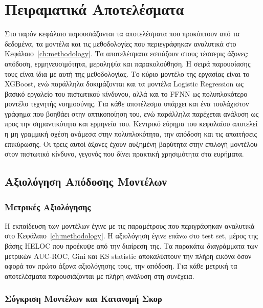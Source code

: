 \chapter{Πειραματικά Αποτελέσματα}
\label{ch:results}

Στο παρόν κεφάλαιο παρουσιάζονται τα αποτελέσματα που προκύπτουν
από τα δεδομένα, τα μοντέλα και τις μεθοδολογίες που περιεγράφηκαν
αναλυτικά στο Κεφάλαιο~\ref{ch:methodology}.
Τα αποτελέσματα εστιάζουν στους τέσσερις άξονες: απόδοση,
ερμηνευσιμότητα, μεροληψία και παρακολούθηση.
Η σειρά παρουσίασης τους είναι ίδια με αυτή της μεθοδολογίας.
Το κύριο μοντέλο της εργασίας είναι το XGBoost, ενώ παράλληλα
δοκιμάζονται και τα μοντέλα Logistic Regression ως βασικό εργαλείο
του πιστωτικού κίνδυνου, αλλά και το FFNN ως πολυπλοκότερο μοντέλο
τεχνητής νοημοσύνης.
Για κάθε αποτέλεσμα υπάρχει και ένα τουλάχιστον γράφημα που βοηθάει
στην οπτικοποίηση του, ενώ παράλληλα παρέχεται ανάλυση ως προς
την σημαντικότητα και ερμηνεία του.
Κεντρικό εύρημα του κεφαλαίου αποτελεί η μη γραμμική σχέση ανάμεσα
στην πολυπλοκότητα, την απόδοση και τις απαιτήσεις επικύρωσης.
Οι τρεις αυτοί άξονες έχουν αυξημένη βαρύτητα στην επιλογή μοντέλου
στον πιστωτικό κίνδυνο, γεγονός που δίνει πρακτική χρησιμότητα
στα ευρήματα.

\section{Αξιολόγηση Απόδοσης Μοντέλων}
\label{sec:performance_results}

\subsection{Μετρικές Αξιολόγησης}
\label{subsec:metrics}
Η εκπαίδευση των μοντέλων έγινε με τις παραμέτρους που
περιγράφηκαν αναλυτικά στο Κεφάλαιο~\ref{ch:methodology}.
Η αξιολόγηση έγινε επάνω στο test set, μέρος της βάσης
HELOC που προέκυψε από την διαίρεση της.
Τα παρακάτω διαγράμματα των μετρικών AUC-ROC, Gini και
KS statistic αποκαλύπτουν την πλήρη εικόνα
όσον αφορά τον πρώτο άξονα αξιολόγησης τους, την απόδοση.
Για κάθε μετρική τα αποτελέσματα παρουσιάζονται με πλήρη
ανάλυση στη συνέχεια.



\subsection{Σύγκριση Μοντέλων και Κατανομή Σκορ}
\label{subsec:model_comparison}

